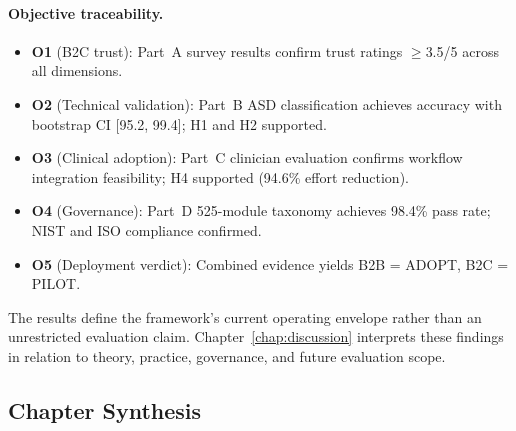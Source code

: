 \paragraph{Objective traceability.}
\begin{itemize}[leftmargin=*, itemsep=2pt]
\item \textbf{O1} (B2C trust): Part~A survey results confirm trust ratings $\geq$3.5/5 across all dimensions.
\item \textbf{O2} (Technical validation): Part~B ASD classification achieves \asdacc{} accuracy with bootstrap CI [95.2, 99.4]; H1 and H2 supported.
\item \textbf{O3} (Clinical adoption): Part~C clinician evaluation confirms workflow integration feasibility; H4 supported (94.6\% effort reduction).
\item \textbf{O4} (Governance): Part~D 525-module taxonomy achieves 98.4\% pass rate; NIST and ISO compliance confirmed.
\item \textbf{O5} (Deployment verdict): Combined evidence yields B2B = ADOPT, B2C = PILOT.
\end{itemize}

\noindent The results define the framework's current operating envelope rather than an unrestricted evaluation claim. Chapter~\ref{chap:discussion} interprets these findings in relation to theory, practice, governance, and future evaluation scope.

\subsection{Chapter Synthesis}
\label{subsec:ch4_synthesis}


